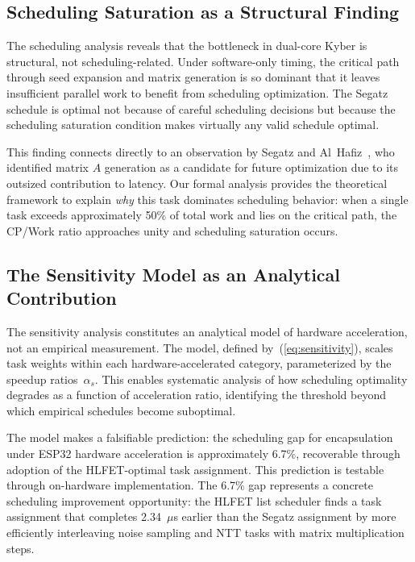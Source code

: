 \documentclass[journal]{IEEEtran}
\begin{document}
\subsection{Scheduling Saturation as a Structural Finding}

The scheduling analysis reveals that the bottleneck in dual-core Kyber is structural, not scheduling-related. Under software-only timing, the critical path through seed expansion and matrix generation is so dominant that it leaves insufficient parallel work to benefit from scheduling optimization. The Segatz schedule is optimal not because of careful scheduling decisions but because the scheduling saturation condition makes virtually any valid schedule optimal.

This finding connects directly to an observation by Segatz and Al~Hafiz~\cite{segatz2022}, who identified matrix $A$ generation as a candidate for future optimization due to its outsized contribution to latency. Our formal analysis provides the theoretical framework to explain \emph{why} this task dominates scheduling behavior: when a single task exceeds approximately 50\% of total work and lies on the critical path, the CP/Work ratio approaches unity and scheduling saturation occurs.

\subsection{The Sensitivity Model as an Analytical Contribution}

The sensitivity analysis constitutes an analytical model of hardware acceleration, not an empirical measurement. The model, defined by~(\ref{eq:sensitivity}), scales task weights within each hardware-accelerated category, parameterized by the speedup ratios~$\alpha_s$. This enables systematic analysis of how scheduling optimality degrades as a function of acceleration ratio, identifying the threshold beyond which empirical schedules become suboptimal.

The model makes a falsifiable prediction: the scheduling gap for encapsulation under ESP32 hardware acceleration is approximately 6.7\%, recoverable through adoption of the HLFET-optimal task assignment. This prediction is testable through on-hardware implementation. The 6.7\% gap represents a concrete scheduling improvement opportunity: the HLFET list scheduler finds a task assignment that completes 2.34~$\mu$s earlier than the Segatz assignment by more efficiently interleaving noise sampling and NTT tasks with matrix multiplication steps.
\end{document}
